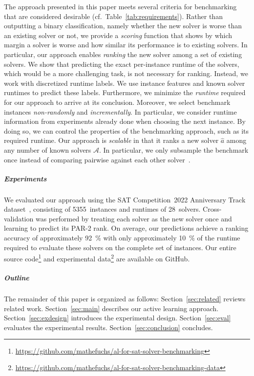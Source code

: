\documentclass[sn-basic, Numbered]{sn-jnl} %
\begin{document}
The approach presented in this paper meets several criteria for benchmarking that are considered desirable (cf.~Table~\ref{tab:requirements}).
Rather than outputting a binary classification, namely whether the new solver is worse than an existing solver or not, we provide a \emph{scoring} function that shows by which margin a solver is worse and how similar its performance is to existing solvers.
In particular, our approach enables \emph{ranking} the new solver among a set of existing solvers.
We show that predicting the exact per-instance runtime of the solvers, which would be a more challenging task, is not necessary for ranking.
Instead, we work with discretized runtime labels.
We use instance features and known solver runtimes to predict these labels.
Furthermore, we minimize the \emph{runtime} required for our approach to arrive at its conclusion.
Moreover, we select benchmark instances \emph{non-randomly} and \emph{incrementally}.
In particular, we consider runtime information from experiments already done when choosing the next instance.
By doing so, we can control the properties of the benchmarking approach, such as its required runtime.
Our approach is \emph{scalable} in that it ranks a new solver $\hat{a}$ among any number of known solvers $\mathcal{A}$.
In particular, we only subsample the benchmark once instead of comparing pairwise against each other solver~\cite{MatriconAFSH21}.

\subparagraph{Experiments}

We evaluated our approach using the SAT Competition~2022 Anniversary Track dataset~\cite{sat2022}, consisting of 5355~instances and runtimes of 28~solvers.
Cross-validation was performed by treating each solver as the new solver once and learning to predict its PAR-2 rank.
On average, our predictions achieve a ranking accuracy of approximately \SI{92}{\%} with only approximately \SI{10}{\%} of the runtime required to evaluate these solvers on the complete set of instances.
Our entire source code\footnote{\url{https://github.com/mathefuchs/al-for-sat-solver-benchmarking}} and experimental data\footnote{\url{https://github.com/mathefuchs/al-for-sat-solver-benchmarking-data}} are available on GitHub.

\subparagraph{Outline}

The remainder of this paper is organized as follows:
Section~\ref{sec:related} reviews related work.
Section~\ref{sec:main} describes our active learning approach.
Section~\ref{sec:exdesign} introduces the experimental design.
Section~\ref{sec:eval} evaluates the experimental results.
Section~\ref{sec:conclusion} concludes.
\end{document}
